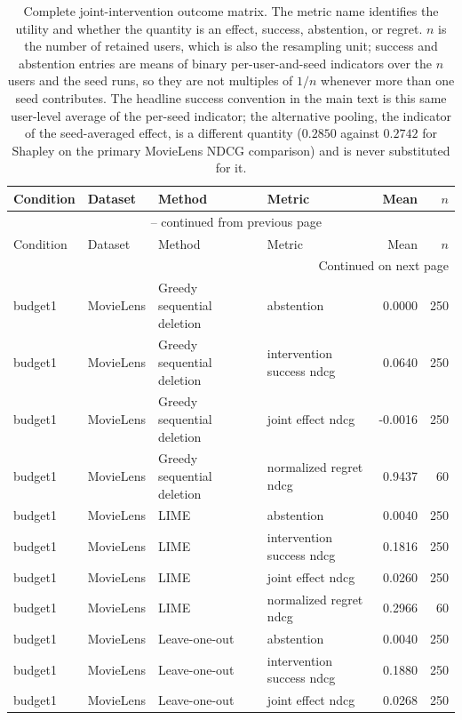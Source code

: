 \begin{longtable}{@{}p{}p{}p{}p{}rr@{}}
\caption{Complete joint-intervention outcome matrix. The metric name identifies the utility and whether the quantity is an effect, success, abstention, or regret. $n$ is the number of retained users, which is also the resampling unit; success and abstention entries are means of binary per-user-and-seed indicators over the $n$ users and the seed runs, so they are not multiples of $1/n$ whenever more than one seed contributes. The headline success convention in the main text is this same user-level average of the per-seed indicator; the alternative pooling, the indicator of the seed-averaged effect, is a different quantity ($0.2850$ against $0.2742$ for Shapley on the primary MovieLens NDCG comparison) and is never substituted for it.}\label{tab:S2}\\
\toprule
Condition & Dataset & Method & Metric & Mean & $n$ \\
\midrule
\endfirsthead
\multicolumn{6}{c}{\tablename\ \thetable{} -- continued from previous page}\\
\toprule
Condition & Dataset & Method & Metric & Mean & $n$ \\
\midrule
\endhead
\midrule
\multicolumn{6}{r}{Continued on next page}\\
\endfoot
\bottomrule
\endlastfoot
budget1 & MovieLens & Greedy sequential deletion & abstention & 0.0000 & 250 \\
budget1 & MovieLens & Greedy sequential deletion & intervention success ndcg & 0.0640 & 250 \\
budget1 & MovieLens & Greedy sequential deletion & joint effect ndcg & -0.0016 & 250 \\
budget1 & MovieLens & Greedy sequential deletion & normalized regret ndcg & 0.9437 & 60 \\
budget1 & MovieLens & LIME & abstention & 0.0040 & 250 \\
budget1 & MovieLens & LIME & intervention success ndcg & 0.1816 & 250 \\
budget1 & MovieLens & LIME & joint effect ndcg & 0.0260 & 250 \\
budget1 & MovieLens & LIME & normalized regret ndcg & 0.2966 & 60 \\
budget1 & MovieLens & Leave-one-out & abstention & 0.0040 & 250 \\
budget1 & MovieLens & Leave-one-out & intervention success ndcg & 0.1880 & 250 \\
budget1 & MovieLens & Leave-one-out & joint effect ndcg & 0.0268 & 250 \\

\end{longtable}
